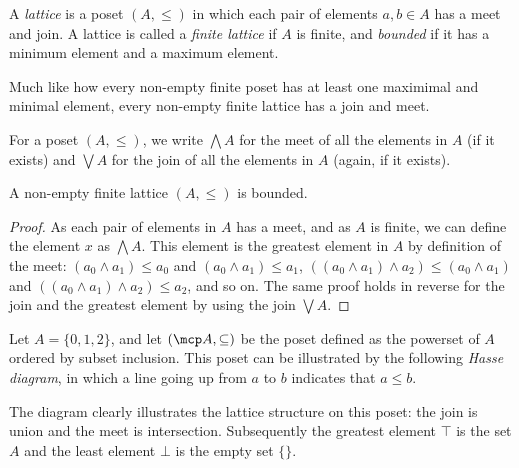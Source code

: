 \begin{definition}[Lattice]
    A \emph{lattice} is a poset \((A, \leq)\) in which each pair of elements
    \(a,b \in A\) has a meet and join.
    A lattice is called a \emph{finite lattice} if \(A\) is finite, and
    \emph{bounded} if it has a minimum element and a maximum element.
\end{definition}

Much like how every non-empty finite poset has at least one maximimal and
minimal element, every non-empty finite lattice has a join and meet.

\begin{notation}
    For a poset \((A, \leq)\), we write \(\bigwedge A\) for the meet of
    all the elements in \(A\) (if it exists) and \(\bigvee A\) for the join of
    all the elements in \(A\) (again, if it exists).
\end{notation}

\begin{lemma}\label{cref:finite-bounded}
    A non-empty finite lattice \((A, \leq)\) is bounded.
\end{lemma}
\begin{proof}
    As each pair of elements in \(A\) has a meet, and as \(A\) is finite, we
    can define the element \(x\) as \(\bigwedge A\).
    This element is the greatest element in \(A\) by definition of the meet:
    \((a_0 \wedge a_1) \leq a_0\) and \((a_0 \wedge a_1) \leq a_1\),
    \(((a_0 \wedge a_1) \wedge a_2) \leq (a_0 \wedge a_1)\) and
    \(((a_0 \wedge a_1) \wedge a_2) \leq a_2\), and so on.
    The same proof holds in reverse for the join and the greatest element by
    using the join \(\bigvee A\).
\end{proof}

\begin{example}\label{ex:powerset-lattice}
    Let \(A = \{0,1,2\}\), and let \((\mcp A, \subseteq)\) be the poset defined
    as the powerset of \(A\) ordered by subset inclusion.
    This poset can be illustrated by the following \emph{Hasse diagram}, in
    which a line going up from \(a\) to \(b\) indicates that \(a \leq b\).

    \begin{center}
    \end{center}

    The diagram clearly illustrates the lattice structure on this poset: the
    join is union and the meet is intersection.
    Subsequently the greatest element \(\top\) is the set \(A\) and the
    least element \(\bot\) is the empty set \(\{\}\).
\end{example}

